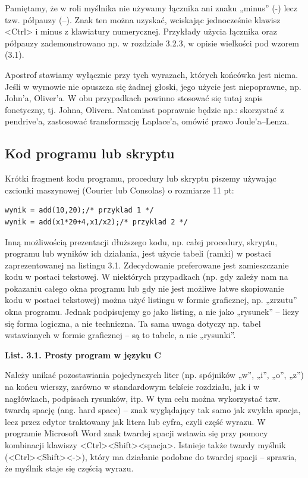 Pamiętamy, że w roli myślnika nie używamy łącznika ani znaku „minus” (-) lecz tzw. półpauzy (–). Znak ten można uzyskać, wciskając jednocześnie klawisz <Ctrl> i minus z klawiatury numerycznej. Przykłady użycia łącznika oraz półpauzy zademonstrowano np. w rozdziale 3.2.3, w opisie wielkości pod wzorem (3.1).

Apostrof stawiamy wyłącznie przy tych wyrazach, których końcówka jest niema. Jeśli w wymowie nie opuszcza się żadnej głoski, jego użycie jest niepoprawne, np. John’a, Oliver’a. W obu przypadkach powinno stosować się tutaj zapis fonetyczny, tj. Johna, Olivera. Natomiast poprawnie będzie np.: skorzystać z pendrive’a, zastosować transformację Laplace’a, omówić prawo Joule’a–Lenza.

\subsection{Kod programu lub skryptu}

Krótki fragment kodu programu, procedury lub skryptu piszemy używając czcionki maszynowej (Courier lub Consolas) o rozmiarze 11 pt:

\begin{lstlisting}
wynik = add(10,20);/* przyklad 1 */
wynik = add(x1*20+4,x1/x2);/* przyklad 2 */
\end{lstlisting}

Inną możliwością prezentacji dłuższego kodu, np. całej procedury, skryptu, programu lub wyników ich działania, jest użycie tabeli (ramki) w postaci zaprezentowanej na listingu 3.1. Zdecydowanie preferowane jest zamieszczanie kodu w postaci tekstowej. W niektórych przypadkach (np. gdy zależy nam na pokazaniu całego okna programu lub gdy nie jest możliwe łatwe skopiowanie kodu w postaci tekstowej) można użyć listingu w formie graficznej, np. „zrzutu” okna programu. Jednak podpisujemy go jako listing, a nie jako „rysunek” – liczy się forma logiczna, a nie techniczna. Ta sama uwaga dotyczy np. tabel wstawianych w formie graficznej – są to tabele, a nie „rysunki”.

\textbf{List. 3.1. Prosty program w języku C}

Należy unikać pozostawiania pojedynczych liter (np. spójników „w”, „i”, „o”, „z”) na końcu wierszy, zarówno w standardowym tekście rozdziału, jak i w nagłówkach, podpisach rysunków, itp. W tym celu można wykorzystać tzw. twardą spację (ang. hard space) – znak wyglądający tak samo jak zwykła spacja, lecz przez edytor traktowany jak litera lub cyfra, czyli część wyrazu. W programie Microsoft Word znak twardej spacji wstawia się przy pomocy kombinacji klawiszy <Ctrl><Shift><spacja>. Istnieje także twardy myślnik (<Ctrl><Shift><->), który ma działanie podobne do twardej spacji – sprawia, że myślnik staje się częścią wyrazu.


